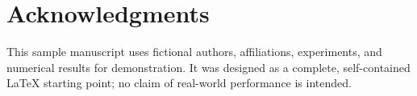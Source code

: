 \section*{Acknowledgments}

This sample manuscript uses fictional authors, affiliations, experiments, and numerical
results for demonstration. It was designed as a complete, self-contained LaTeX starting
point; no claim of real-world performance is intended.

{\footnotesize
  
  
}
